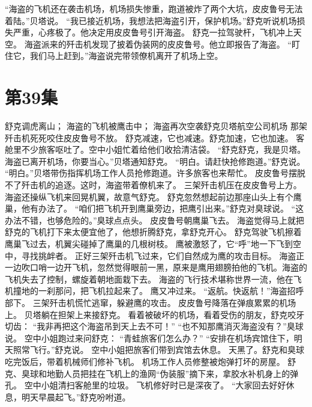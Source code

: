 \documentclass[a4paper,12pt,UTF8,twoside]{ctexbook}
\begin{document}
        “海盗的飞机还在袭击机场，机场损失惨重，跑道被炸了两个大坑，皮皮鲁号无法着陆。”贝塔说。 
        “我已接近机场，我想法把海盗引开，保护机场。”舒克听说机场损失严重，心疼极了。他决定用皮皮鲁号引开海盗。 
        舒克一拉驾驶杆，飞机冲上天空。 
        海盗派来的歼击机发现了披着伪装网的皮皮鲁号。他立即报告了海盗。 
        “盯住它，我们马上赶到。”海盗说完带领僚机离开了机场上空。   \chapter{第39集} 
        舒克调虎离山； 
        海盗的飞机被鹰击中； 
        海盗再次空袭舒克贝塔航空公司机场   
        那架歼击机死死咬住皮皮鲁号不放。 
        舒克减速，它也减速。舒克加速，它也加速。 
        客舱里不少旅客呕吐了。空中小姐忙着给他们收拾清洁袋。 
        “舒克舒克，我是贝塔。海盗已离开机场，你要当心。”贝塔通知舒克。 
        “明白。请赶快抢修跑道。”舒克说。 
        “明白。”贝塔带伤指挥机场工作人员抢修跑道。许多旅客也来帮忙。 
        皮皮鲁号摆脱不了歼击机的追逐。这时，海盗带着僚机来了。 
        三架歼击机压在皮皮鲁号上方。海盗还操纵飞机来回晃机翼，故意气舒克。 
        舒克忽然想起前边那座山头上有个鹰巢，他有办法了。 
        “咱们把飞机开到鹰巢旁边，把鹰引出来。”舒克对臭球说。 
        “这办法不错，也够危险的。”臭球点点头。 
        皮皮鲁号朝鹰巢飞去。 
        海盗觉得马上就把舒克的飞机打下来太便宜他了，他想折腾舒克，拿舒克开心。 
        舒克驾驶飞机擦着鹰巢飞过去，机翼尖碰掉了鹰巢的几根树枝。 
        鹰被激怒了，它“呼”地一下飞到空中，寻找挑衅者。 
        正好三架歼击机飞过来，它们自然成为鹰的攻击目标。 
        海盗正一边吹口哨一边开飞机，忽然觉得眼前一黑，原来是鹰用翅膀拍他的飞机。海盗的飞机失去了控制，螺旋着朝地面栽下去。 
        海盗的飞行技术堪称世界一流，他在飞机撞地的一刹那问，把飞机拉起来了。 
        鹰又冲过来。 
        “返航。快返航！”海盗招呼部下。 
        三架歼击机慌忙逃窜，躲避鹰的攻击。 
        皮皮鲁号降落在弹痕累累的机场上。 
        贝塔躺在担架上来接舒克。 
        看着被破坏的机场，看着受伤的朋友，舒克咬牙切齿： 
        “我非再把这个海盗吊到天上去不可！” 
        “也不知那鹰消灭海盗没有？”臭球说。 
        空中小姐跑过来问舒克： 
        “青蛙旅客们怎么办？” 
        “安排在机场宾馆住下，明天照常飞行。”舒克说。 
        空中小姐把旅客们带到宾馆去休息。 
        天黑了。舒克和臭球吃完饭后，带着机械师们修补飞机。 
        机场工作人员修整被炮弹打坏的房屋。 
        舒克、臭球和地勤人员把挂在飞机上的渔网“伪装服”摘下来，拿胶水补机身上的弹孔。 
        空中小姐清扫客舱里的垃圾。 
        飞机修好时已是深夜了。 
        “大家回去好好休息，明天早晨起飞。”舒克吩咐道。 
\end{document}
